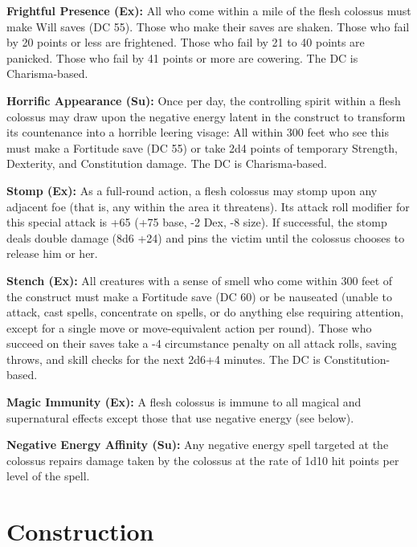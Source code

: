 \documentclass{article}
\begin{document}
\textbf{Frightful Presence (Ex):} All who come within a mile of the flesh colossus 
must make Will saves (DC 55). Those who make their saves are shaken. Those who 
fail by 20 points or less are frightened. Those who fail by 21 to 40 points are 
panicked. Those who fail by 41 points or more are cowering. The DC is Charisma-based.

\textbf{Horrific Appearance (Su):} Once per day, the controlling spirit within 
a flesh colossus may draw upon the negative energy latent in the construct to transform 
its countenance into a horrible leering visage: All within 300 feet who see this 
must make a Fortitude save (DC 55) or take 2d4 points of temporary Strength, Dexterity, 
and Constitution damage. The DC is Charisma-based.

\textbf{Stomp (Ex): }As a full-round action, a flesh colossus may stomp upon any 
adjacent foe (that is, any within the area it threatens). Its attack roll modifier 
for this special attack is +65 (+75 base, -2 Dex, -8 size). If successful, the 
stomp deals double damage (8d6 +24) and pins the victim until the colossus chooses 
to release him or her. 

\textbf{Stench (Ex):} All creatures with a sense of smell who come within 300 feet 
of the construct must make a Fortitude save (DC 60) or be nauseated (unable to 
attack, cast spells, concentrate on spells, or do anything else requiring attention, 
except for a single move or move-equivalent action per round). Those who succeed 
on their saves take a -4 circumstance penalty on all attack rolls, saving throws, 
and skill checks for the next 2d6+4 minutes. The DC is Constitution-based.

\textbf{Magic Immunity (Ex):} A flesh colossus is immune to all magical and supernatural 
effects except those that use negative energy (see below). 

\textbf{Negative Energy Affinity (Su): }Any negative energy spell targeted at the 
colossus repairs damage taken by the colossus at the rate of 1d10 hit points per 
level of the spell. 

\section*{\textbf{Construction }}
\end{document}
